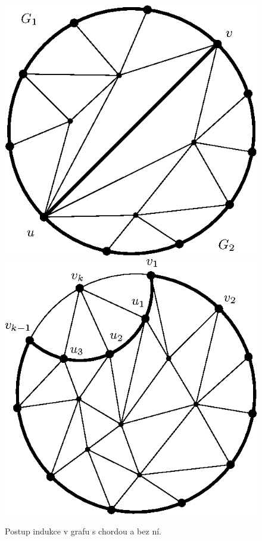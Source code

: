 \noindent
\begin{figure}[h!]
	\centering
	\includegraphics{img/thomassen-chord.eps}
	\includegraphics{img/thomassen-induction.eps}
	\caption{Postup indukce v grafu s chordou a bez ní.}
\end{figure}

